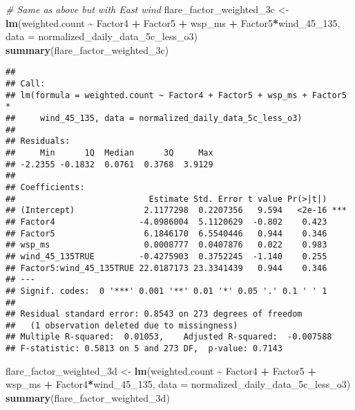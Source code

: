 \documentclass[
]{article}
\newenvironment{Shaded}{\begin{snugshade}}{\end{snugshade}}
\newcommand{\AttributeTok}[1]{\textcolor[rgb]{0.13,0.29,0.53}{#1}}
\newcommand{\CommentTok}[1]{\textcolor[rgb]{0.56,0.35,0.01}{\textit{#1}}}
\newcommand{\FunctionTok}[1]{\textcolor[rgb]{0.13,0.29,0.53}{\textbf{#1}}}
\newcommand{\NormalTok}[1]{#1}
\newcommand{\OtherTok}[1]{\textcolor[rgb]{0.56,0.35,0.01}{#1}}
\newcommand{\SpecialCharTok}[1]{\textcolor[rgb]{0.81,0.36,0.00}{\textbf{#1}}}
\begin{document}
\begin{Shaded}
\begin{Highlighting}[]
\CommentTok{\# Same as above but with East wind}
\NormalTok{flare\_factor\_weighted\_3c }\OtherTok{\textless{}{-}} \FunctionTok{lm}\NormalTok{(weighted.count }\SpecialCharTok{\textasciitilde{}}\NormalTok{ Factor4 }\SpecialCharTok{+}\NormalTok{ Factor5 }\SpecialCharTok{+}\NormalTok{ wsp\_ms }\SpecialCharTok{+} 
\NormalTok{                                 Factor5}\SpecialCharTok{*}\NormalTok{wind\_45\_135, }
                               \AttributeTok{data =}\NormalTok{ normalized\_daily\_data\_5c\_less\_o3)}
\FunctionTok{summary}\NormalTok{(flare\_factor\_weighted\_3c)}
\end{Highlighting}
\end{Shaded}

\begin{verbatim}
## 
## Call:
## lm(formula = weighted.count ~ Factor4 + Factor5 + wsp_ms + Factor5 * 
##     wind_45_135, data = normalized_daily_data_5c_less_o3)
## 
## Residuals:
##     Min      1Q  Median      3Q     Max 
## -2.2355 -0.1832  0.0761  0.3768  3.9129 
## 
## Coefficients:
##                           Estimate Std. Error t value Pr(>|t|)    
## (Intercept)              2.1177298  0.2207356   9.594   <2e-16 ***
## Factor4                 -4.0986004  5.1120629  -0.802    0.423    
## Factor5                  6.1846170  6.5540446   0.944    0.346    
## wsp_ms                   0.0008777  0.0407876   0.022    0.983    
## wind_45_135TRUE         -0.4275903  0.3752245  -1.140    0.255    
## Factor5:wind_45_135TRUE 22.0187173 23.3341439   0.944    0.346    
## ---
## Signif. codes:  0 '***' 0.001 '**' 0.01 '*' 0.05 '.' 0.1 ' ' 1
## 
## Residual standard error: 0.8543 on 273 degrees of freedom
##   (1 observation deleted due to missingness)
## Multiple R-squared:  0.01053,    Adjusted R-squared:  -0.007588 
## F-statistic: 0.5813 on 5 and 273 DF,  p-value: 0.7143
\end{verbatim}

\begin{Shaded}
\begin{Highlighting}[]
\NormalTok{flare\_factor\_weighted\_3d }\OtherTok{\textless{}{-}} \FunctionTok{lm}\NormalTok{(weighted.count }\SpecialCharTok{\textasciitilde{}}\NormalTok{ Factor4 }\SpecialCharTok{+}\NormalTok{ Factor5 }\SpecialCharTok{+}\NormalTok{ wsp\_ms }\SpecialCharTok{+} 
\NormalTok{                                 Factor4}\SpecialCharTok{*}\NormalTok{wind\_45\_135, }
                               \AttributeTok{data =}\NormalTok{ normalized\_daily\_data\_5c\_less\_o3)}
\FunctionTok{summary}\NormalTok{(flare\_factor\_weighted\_3d)}
\end{Highlighting}
\end{Shaded}
\end{document}
